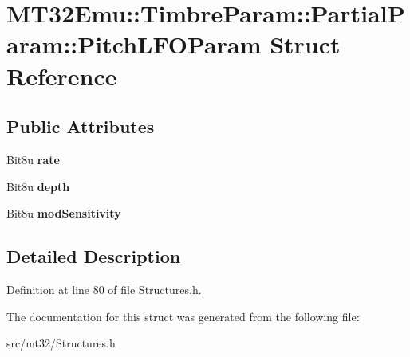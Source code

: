 \hypertarget{structMT32Emu_1_1TimbreParam_1_1PartialParam_1_1PitchLFOParam}{\section{M\-T32\-Emu\-:\-:Timbre\-Param\-:\-:Partial\-Param\-:\-:Pitch\-L\-F\-O\-Param Struct Reference}
\label{structMT32Emu_1_1TimbreParam_1_1PartialParam_1_1PitchLFOParam}
}
\subsection*{Public Attributes}
\begin{DoxyCompactItemize}
\item 
\hypertarget{structMT32Emu_1_1TimbreParam_1_1PartialParam_1_1PitchLFOParam_a8c1afe72bc19a6b98139e96b1ef3a3d9}{Bit8u {\bfseries rate}}\label{structMT32Emu_1_1TimbreParam_1_1PartialParam_1_1PitchLFOParam_a8c1afe72bc19a6b98139e96b1ef3a3d9}

\item 
\hypertarget{structMT32Emu_1_1TimbreParam_1_1PartialParam_1_1PitchLFOParam_a52ad6dcbcac76b7509eba8d164ef5f6d}{Bit8u {\bfseries depth}}\label{structMT32Emu_1_1TimbreParam_1_1PartialParam_1_1PitchLFOParam_a52ad6dcbcac76b7509eba8d164ef5f6d}

\item 
\hypertarget{structMT32Emu_1_1TimbreParam_1_1PartialParam_1_1PitchLFOParam_abc605bfed7545bb6ffbdc48bb3dad97d}{Bit8u {\bfseries mod\-Sensitivity}}\label{structMT32Emu_1_1TimbreParam_1_1PartialParam_1_1PitchLFOParam_abc605bfed7545bb6ffbdc48bb3dad97d}

\end{DoxyCompactItemize}


\subsection{Detailed Description}


Definition at line 80 of file Structures.\-h.



The documentation for this struct was generated from the following file\-:\begin{DoxyCompactItemize}
\item 
src/mt32/Structures.\-h\end{DoxyCompactItemize}
